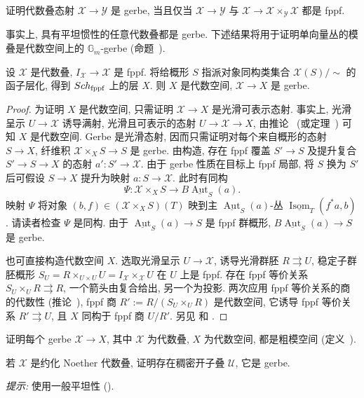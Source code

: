 \begin{exercise}\label{src:7.4.18}
证明代数叠态射 $\mathcal X\to\mathcal Y$ 是 gerbe, 当且仅当 $\mathcal X\to\mathcal Y$ 与 $\mathcal X\to\mathcal X\times_{\mathcal Y}\mathcal X$ 都是 fppf.
\end{exercise}
事实上, 具有平坦惯性的任意代数叠都是 gerbe. 下述结果将用于证明单向量丛的模叠是代数空间上的 $\mathbb G_m$-gerbe (命题~).
\begin{proposition}\label{src:7.4.19}
设 $\mathcal X$ 是代数叠, $I_{\mathcal X}\to\mathcal X$ 是 fppf. 将给概形 $S$ 指派对象同构类集合 $\mathcal X(S)/\!\sim$ 的函子层化, 得到 $Sch_{\mathrm{fppf}}$ 上的层 $X$. 则 $X$ 是代数空间, $\mathcal X\to X$ 是 gerbe.
\end{proposition}
\begin{proof}
为证明 $X$ 是代数空间, 只需证明 $\mathcal X\to X$ 是光滑可表示态射. 事实上, 光滑呈示 $U\to\mathcal X$ 诱导满射, 光滑且可表示的态射 $U\to\mathcal X\to X$, 由推论~ (或定理~) 可知 $X$ 是代数空间. Gerbe 是光滑态射, 因而只需证明对每个来自概形的态射 $S\to X$, 纤维积 $\mathcal X\times_X S\to S$ 是 gerbe. 由构造, 存在 fppf 覆盖 $S'\to S$ 及提升复合 $S'\to S\to X$ 的态射 $a':S'\to\mathcal X$. 由于 gerbe 性质在目标上 fppf 局部, 将 $S$ 换为 $S'$ 后可假设 $S\to X$ 提升为映射 $a:S\to\mathcal X$. 此时有同构
\[
\Psi:\mathcal X\times_X S\longrightarrow B\underline{\operatorname{Aut}}_S(a).
\]
映射 $\Psi$ 将对象 $(b,f)\in(\mathcal X\times_X S)(T)$ 映到主 $\underline{\operatorname{Aut}}_S(a)$-丛 $\underline{\operatorname{Isom}}_T(f^*a,b)$. 请读者检查 $\Psi$ 是同构. 由于 $\underline{\operatorname{Aut}}_S(a)\to S$ 是 fppf 群概形, $B\underline{\operatorname{Aut}}_S(a)\to S$ 是 gerbe.

也可直接构造代数空间 $X$. 选取光滑呈示 $U\to\mathcal X$, 诱导光滑群胚 $R\rightrightarrows U$, 稳定子群胚概形 $S_U=R\times_{U\times U}U=I_{\mathcal X}\times_{\mathcal X}U$ 在 $U$ 上是 fppf. 存在 fppf 等价关系 $S_U\times_U R\rightrightarrows R$, 一个箭头由复合给出, 另一个为投影. 两次应用 fppf 等价关系的商的代数性 (推论~), fppf 商 $R':=R/(S_U\times_U R)$ 是代数空间, 它诱导 fppf 等价关系 $R'\rightrightarrows U$, 且 $X$ 同构于 fppf 商 $U/R'$. 另见 \cite[推论 10.8]{LMB00} 和 \cite[Tags 06QD 与 06QJ]{SP}.
\end{proof}
\begin{exercise}\label{src:7.4.20}
证明每个 gerbe $\mathcal X\to X$, 其中 $\mathcal X$ 为代数叠, $X$ 为代数空间, 都是粗模空间 (定义~).
\end{exercise}
\begin{exercise}\label{src:7.4.21}
若 $\mathcal X$ 是约化 Noether 代数叠, 证明存在稠密开子叠 $\mathcal U$, 它是 gerbe.

\textit{提示:} 使用一般平坦性 ().
\end{exercise}
